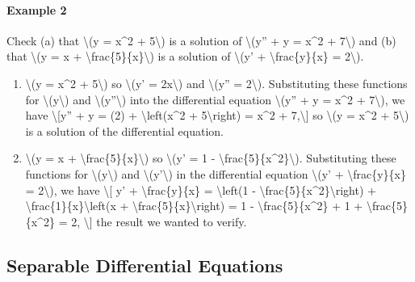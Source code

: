 \hypertarget{example-2}{%
\paragraph{Example 2}\label{example-2}}

Check (a) that \textbackslash{}(y = x\^{}2 + 5\textbackslash{}) is a
solution of \textbackslash{}(y'' + y = x\^{}2 + 7\textbackslash{}) and
(b) that \textbackslash{}(y = x +
\textbackslash{}frac\{5\}\{x\}\textbackslash{}) is a solution of
\textbackslash{}(y' + \textbackslash{}frac\{y\}\{x\} =
2\textbackslash{}).

\begin{enumerate}
\tightlist
\item
  \textbackslash{}(y = x\^{}2 + 5\textbackslash{}) so
  \textbackslash{}(y' = 2x\textbackslash{}) and \textbackslash{}(y'' =
  2\textbackslash{}). Substituting these functions for
  \textbackslash{}(y\textbackslash{}) and
  \textbackslash{}(y''\textbackslash{}) into the differential equation
  \textbackslash{}(y'' + y = x\^{}2 + 7\textbackslash{}), we have
  \textbackslash{}{[}y'' + y = (2) + \textbackslash{}left(x\^{}2 +
  5\textbackslash{}right) = x\^{}2 + 7,\textbackslash{}{]} so
  \textbackslash{}(y = x\^{}2 + 5\textbackslash{}) is a solution of the
  differential equation.
\item
  \textbackslash{}(y = x +
  \textbackslash{}frac\{5\}\{x\}\textbackslash{}) so \textbackslash{}(y'
  = 1 - \textbackslash{}frac\{5\}\{x\^{}2\}\textbackslash{}).
  Substituting these functions for \textbackslash{}(y\textbackslash{})
  and \textbackslash{}(y'\textbackslash{}) in the differential equation
  \textbackslash{}(y' + \textbackslash{}frac\{y\}\{x\} =
  2\textbackslash{}), we have \textbackslash{}{[} y' +
  \textbackslash{}frac\{y\}\{x\} = \textbackslash{}left(1 -
  \textbackslash{}frac\{5\}\{x\^{}2\}\textbackslash{}right) +
  \textbackslash{}frac\{1\}\{x\}\textbackslash{}left(x +
  \textbackslash{}frac\{5\}\{x\}\textbackslash{}right) = 1 -
  \textbackslash{}frac\{5\}\{x\^{}2\} + 1 +
  \textbackslash{}frac\{5\}\{x\^{}2\} = 2, \textbackslash{}{]} the
  result we wanted to verify.
\end{enumerate}

\hypertarget{separable-differential-equations}{%
\subsection{Separable Differential
Equations}\label{separable-differential-equations}}

